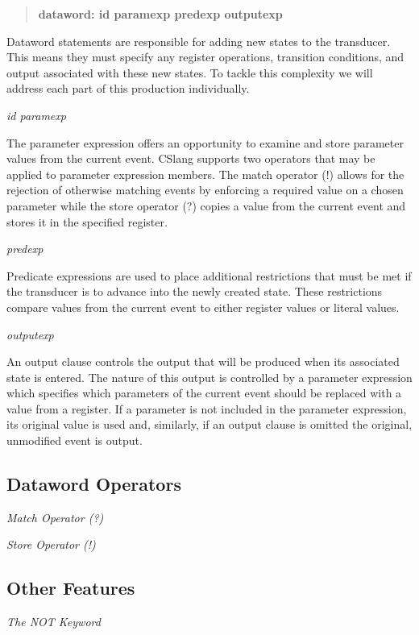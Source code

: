 \begin{quote}
\centering
\textbf{dataword: id paramexp predexp outputexp}
\end{quote}

Dataword statements are responsible for adding new states to the
transducer.  This means they must specify any register operations,
transition conditions, and output associated with these new states.  To
tackle this complexity we will address each part of this production
individually.

\textit{id paramexp}

The parameter expression offers an opportunity to examine and store
parameter values from the current event.  CSlang supports two operators
that may be applied to parameter expression members.  The match operator
(!) allows for the rejection of otherwise matching events
by enforcing a required value on a
chosen parameter while the store operator (?) copies a value from the
current event and stores it in the specified register.


\textit{predexp}

Predicate expressions are used to place additional restrictions that must
be met if the transducer is to advance into the newly created state.  These
restrictions compare values from the current event to either register
values or literal values.

\textit{outputexp}

An output clause controls the output that will be produced when its
associated state is entered.  The nature of this output is controlled by a
parameter expression which specifies which parameters of the current event
should be replaced with a value from a register.  If a parameter is not
included in the parameter expression, its original value is used and,
similarly,
if an output clause is omitted the original, unmodified event is output.

\subsection{Dataword Operators}
\textit{Match Operator (?)}

\textit{Store Operator (!)}


\subsection{Other Features}
\textit{The NOT Keyword}



